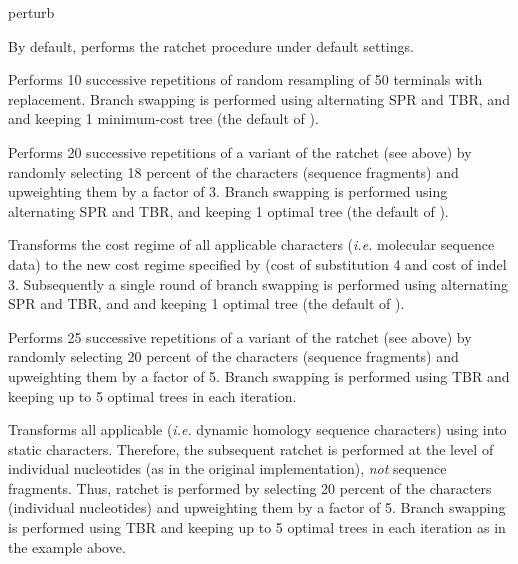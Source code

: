 \begin{command}{perturb}{}
\begin{arguments}
	\end{arguments}

        {By default, \poy performs the ratchet procedure under default
        settings.}
	
	\begin{poyexamples}
	
	{Performs 10 successive repetitions of random resampling of 50
	terminals with replacement. Branch swapping is performed using
	alternating SPR and TBR, and and keeping 1 minimum-cost
	tree (the default of ).}
	
            {Performs 20 successive repetitions of a variant of the ratchet (see
            above) by randomly selecting 18 percent of the characters (sequence
            fragments) and upweighting them by a factor of 3. Branch swapping is
            performed using alternating SPR and TBR, and keeping 1
            optimal tree (the default of ).}

            {Transforms the cost regime of all applicable characters (\emph{i.e.} molecular 
            sequence data) to the new cost regime specified by
             (cost of substitution 4 and cost of indel 3.
            Subsequently a single round of branch swapping is
            performed using alternating SPR and TBR, and and keeping 1
            optimal tree (the default of ).}
            
            {Performs 25 successive repetitions of a variant of the ratchet (see
            above) by randomly selecting 20 percent of the characters (sequence
            fragments) and upweighting them by a factor of 5. Branch swapping is
            performed using TBR and keeping up to 5 optimal trees in each iteration.}
            
            {Transforms all applicable (\emph{i.e.} dynamic homology sequence characters) using
             into static characters. 
            Therefore, the subsequent ratchet is performed at the level of
            individual nucleotides (as in the original implementation), \emph{not}
            sequence fragments. Thus, ratchet is performed by selecting 20 percent of
            the characters (individual nucleotides) and upweighting them by a factor of 5.
            Branch swapping is performed using TBR and keeping up to 5 optimal trees in 
            each iteration as in the example above.}


\end{poyexamples}
\end{command}

